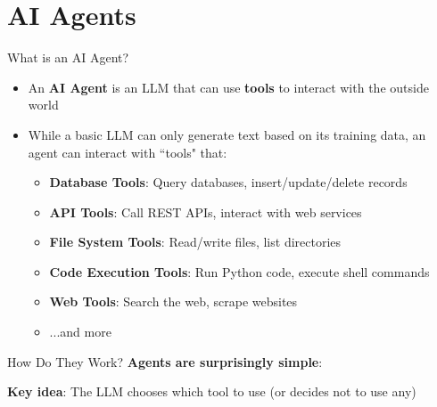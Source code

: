 \documentclass[aspectratio=169]{beamer}
\begin{document}
\section{AI Agents}

\begin{frame}{What is an AI Agent?}
\begin{itemize}
    \item An \textbf{AI Agent} is an LLM that can use \textbf{tools} to interact with the outside world
    \item While a basic LLM can only generate text based on its training data, an agent can interact with ``tools" that:
\begin{itemize}
    \item \textbf{Database Tools}: Query databases, insert/update/delete records
    \item \textbf{API Tools}: Call REST APIs, interact with web services
    \item \textbf{File System Tools}: Read/write files, list directories
    \item \textbf{Code Execution Tools}: Run Python code, execute shell commands
    \item \textbf{Web Tools}: Search the web, scrape websites
    \item ...and more
\end{itemize}
\end{itemize}
\end{frame}


\begin{frame}{How Do They Work?}
\textbf{Agents are surprisingly simple}:
\vspace{0.3cm}

\begin{center}
\end{center}
\vspace{0.3cm}

\textbf{Key idea}: The LLM chooses which tool to use (or decides not to use any)
\end{frame}
\end{document}
